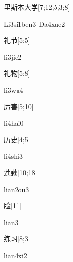 \begin{verbete}{里斯本大学}[7;12;5;3;8]
\begin{pronuncia}[\\]{Li3si1ben3\ Da4xue2}
\end{pronuncia}
\end{verbete}

\begin{verbete}[li3jie2]{礼节}[5;5]
\begin{pronuncia}{li3jie2}
\end{pronuncia}
\end{verbete}

\begin{verbete}[li3wu4]{礼物}[5;8]
\begin{pronuncia}{li3wu4}
\end{pronuncia}
\end{verbete}

\begin{verbete}[li4hai0]{厉害}[5;10]
\begin{pronuncia}{li4hai0}
\end{pronuncia}
\end{verbete}

\begin{verbete}[li4shi3]{历史}[4;5]
\begin{pronuncia}{li4shi3}
\end{pronuncia}
\end{verbete}

\begin{verbete}[lian2ou3]{莲藕}[10;18]
\begin{pronuncia}{lian2ou3}
\end{pronuncia}
\end{verbete}

\begin{verbete}[lian3]{脸}[11]
\begin{pronuncia}{lian3}
\end{pronuncia}
\end{verbete}

\begin{verbete}[lian4xi2]{练习}[8;3]
\begin{pronuncia}{lian4xi2}
\end{pronuncia}
\end{verbete}

